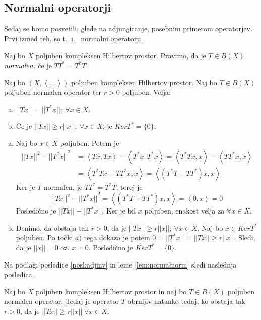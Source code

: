 \documentclass[mat2]{matdelo}
\newcommand{\abs}[1]{\ensuremath{\lvert #1 \rvert}}
\newcommand{\norm}[1]{\abs{\abs{#1}}}
\newcommand{\pojem}[1]{\ensuremath{\emph{#1}}}
\newcommand{\Sp}[2]{\ensuremath{\left<#1, #2\right>}}
\begin{document}
		\subsection{Normalni operatorji}
			Sedaj se bomo posvetili, glede na adjungiranje, posebnim primerom operatorjev. Prvi izmed teh, so t.~i.~ normalni operatorji.
			\begin{definicija}
				\label{def:normalop}
				Naj bo $X$ poljuben kompleksen Hilbertov prostor. Pravimo, da je $T \in B(X)$ \pojem{normalen}, če je $TT^* = T^*T$.
			\end{definicija}
			
			\begin{lema}
				\label{lem:normalnorm}
				Naj bo $(X, \Sp{.}{.})$ poljuben kompleksen Hilbertov prostor. Naj bo $T\in B(X)$ poljuben normalen operator ter $r > 0$ poljuben. Velja: \begin{enumerate}[a)]
					\item $\norm{Tx} = \norm{T^*x};~\forall x\in X$.
					\item Če je $\norm{Tx} \geq r\norm{x};~\forall x\in X$, je $KerT^* = \{0\}$.
				\end{enumerate}
			\end{lema}
			\begin{dokaz}
				\begin{enumerate}[a)]
					\item Naj bo $x\in X$ poljuben. Potem je \begin{align*}
						\norm{Tx}^2 - \norm{T^*x}^2 &= \Sp{Tx}{Tx} - \Sp{T^*x}{T^*x} = \Sp{T^*Tx}{x} - \Sp{TT^*x}{x}\\
						&= \Sp{T^*Tx - TT^*x}{x} = \Sp{(T^*T - TT^*)x}{x}
					\end{align*}
					Ker je $T$ normalen, je $TT^* = T^*T$, torej je $$\norm{Tx}^2 - \norm{T^*x}^2 = \Sp{(T^*T - TT^*)x}{x} = \Sp{0}{x} = 0 $$
					Posledično je $\norm{Tx} - \norm{T^*x}$. Ker je bil $x$ poljuben, enakost velja za $\forall x\in X$.
					\item Denimo, da obstaja tak $r>0$, da je $\norm{Tx} \geq r\norm{x};~\forall x\in X$. Naj bo $x\in KerT^*$ poljuben. Po točki $a)$ tega dokaza je potem $0 = \norm{T^*x} = \norm{Tx} \geq r\norm{x}$. Sledi, da je $\norm{x} = 0$ oz. $x = 0$. Posledično je $KerT^* = \{0\}$.
				\end{enumerate}
			\end{dokaz}
			Na podlagi posledice \ref{posl:adjinv} in leme \ref{lem:normalnorm} sledi naslednja posledica.
			\begin{posledica}
				\label{posl:normalinv}
				Naj bo $X$ poljuben kompleksen Hilbertov prostor in naj bo $T\in B(X)$ poljuben normalen operator. Tedaj je operator $T$ obrnljiv natanko tedaj, ko obstaja tak $r > 0$, da je $\norm{Tx} \geq r\norm{x}~\forall x\in X$.
			\end{posledica}
\end{document}
